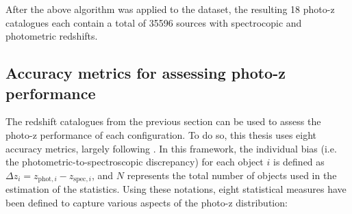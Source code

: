 After the above algorithm was applied to the \DESVIDEO dataset, the resulting 18 photo-z catalogues each contain a total of \num{35596} sources with spectrocopic and photometric redshifts. \par


\subsection{Accuracy metrics for assessing photo-z performance}\label{subsection:accuracy_metrics}
The redshift catalogues from the previous section can be used to assess the photo-z performance of each configuration. To do so, this thesis uses eight accuracy metrics, largely following \cite{2014MNRAS.445.1482S}.  In this framework, the individual bias (i.e. the photometric-to-spectroscopic discrepancy) for each object $i$ is defined as $\Delta z_{i} = z_{\mathrm{phot},i}-z_{\mathrm{spec},i}$, and $N$ represents the total number of objects used in the estimation of the statistics. Using these notations, eight statistical measures have been defined to capture various aspects of the photo-z distribution:



